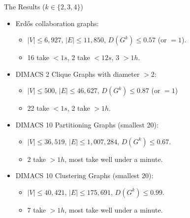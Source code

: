 \documentclass{beamer}
\begin{document}
\begin{frame}{The Results ($k \in \{2, 3, 4\}$)}
    \begin{itemize}
        \item Erd\H{o}s collaboration graphs:
            \begin{itemize}
                \item $|V| \le 6,927$, $|E| \le 11,850$, $D(G^k) \le 0.57$ (or $= 1$).
                \item 16 take $<1s$, 2 take $<12s$, 3 $>1h$.
            \end{itemize}

        \item DIMACS 2 Clique Graphs with diameter $> 2$:
            \begin{itemize}
                \item $|V| \le 500$, $|E| \le 46,627$, $D(G^k) \le 0.87$ (or $= 1$)
                \item 22 take $<1s$, 2 take $>1h$.
            \end{itemize}

        \item DIMACS 10 Partitioning Graphs (smallest 20):
            \begin{itemize}
                \item $|V| \le 36,519$, $|E| \le 1,007,284$, $D(G^k) \le 0.67$.
                \item 2 take $>1h$, most take well under a minute.
            \end{itemize}

        \item DIMACS 10 Clustering Graphs (smallest 20):
            \begin{itemize}
                \item $|V| \le 40,421$, $|E| \le 175,691$, $D(G^k) \le 0.99$.
                \item 7 take $>1h$, most take well under a minute.
            \end{itemize}
    \end{itemize}
\end{frame}
\end{document}
